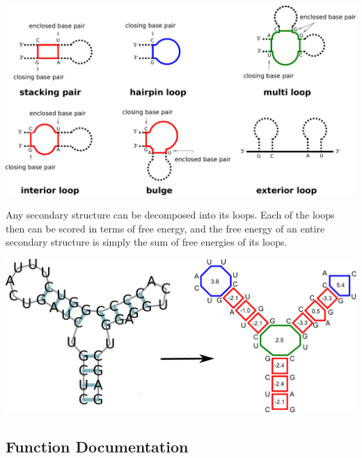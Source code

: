  
\begin{DoxyImageNoCaption}
  \mbox{\includegraphics[width=\textwidth,height=\textheight/2,keepaspectratio=true]{loop_types}}
\end{DoxyImageNoCaption}


Any secondary structure can be decomposed into its loops. Each of the loops then can be scored in terms of free energy, and the free energy of an entire secondary structure is simply the sum of free energies of its loops.

 
\begin{DoxyImageNoCaption}
  \mbox{\includegraphics[width=\textwidth,height=\textheight/2,keepaspectratio=true]{loop_decomposition}}
\end{DoxyImageNoCaption}
 

\subsection{Function Documentation}
